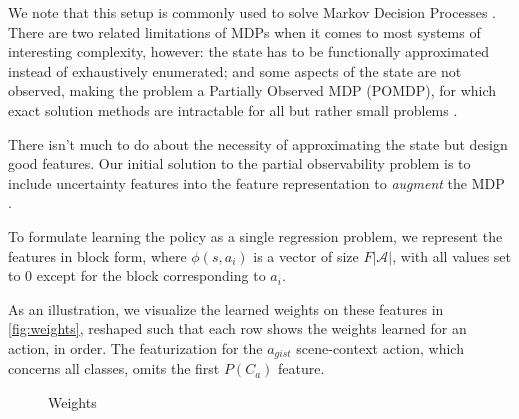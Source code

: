 We note that this setup is commonly used to solve Markov Decision Processes \cite{Sutton1998}.
There are two related limitations of MDPs when it comes to most systems of interesting complexity, however: the state has to be functionally approximated instead of exhaustively enumerated; and some aspects of the state are not observed, making the problem a Partially Observed MDP (POMDP), for which exact solution methods are intractable for all but rather small problems \cite{Roy2002}.

There isn't much to do about the necessity of approximating the state but design good features.
Our initial solution to the partial observability problem is to include uncertainty features into the feature representation to \emph{augment} the MDP \cite{Kwok2004}.

To formulate learning the policy as a single regression problem, we represent the features in block form, where $\phi(s,a_i)$ is a vector of size $F|\mathcal{A}|$, with all values set to $0$ except for the block corresponding to $a_i$.

As an illustration, we visualize the learned weights on these features in \autoref{fig:weights}, reshaped such that each row shows the weights learned for an action, in order.
The featurization for the $a_{gist}$ scene-context action, which concerns all classes, omits the first $P(C_a)$ feature.

\begin{figure}[h!]
\centering
{}
\caption{Weights }
\label{fig:weights}
\end{figure}

